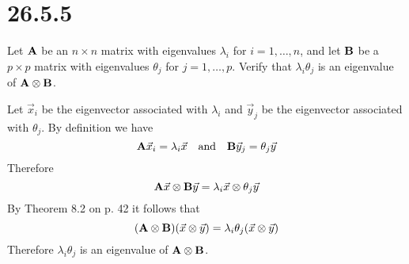 \section*{26.5.5}
Let $\bf A$ be an $n\times n$ matrix with eigenvalues $\lambda_i$
for $i=1,\ldots,n$, and let $\bf B$ be a $p\times p$ matrix with
eigenvalues $\theta_j$ for $j=1,\ldots,p$.
Verify that $\lambda_i\theta_j$ is an eigenvalue of
${\bf A}\otimes{\bf B}$.

\bigskip
\noindent
Let $\vec x_i$ be the eigenvector associated with $\lambda_i$
and $\vec y_j$ be the eigenvector associated with $\theta_j$.
By definition we have
$${\bf A}\vec x_i=\lambda_i\vec x\quad\hbox{and}\quad
{\bf B}\vec y_j=\theta_j\vec y$$
Therefore
$${\bf A}\vec x\otimes{\bf B}\vec y
=\lambda_i\vec x\otimes\theta_j\vec y$$
By Theorem 8.2 on p. 42 it follows that
$$({\bf A}\otimes{\bf B})(\vec x\otimes\vec y)
=\lambda_i\theta_j(\vec x\otimes\vec y)$$
Therefore $\lambda_i\theta_j$ is an eigenvalue of
${\bf A}\otimes{\bf B}$.
